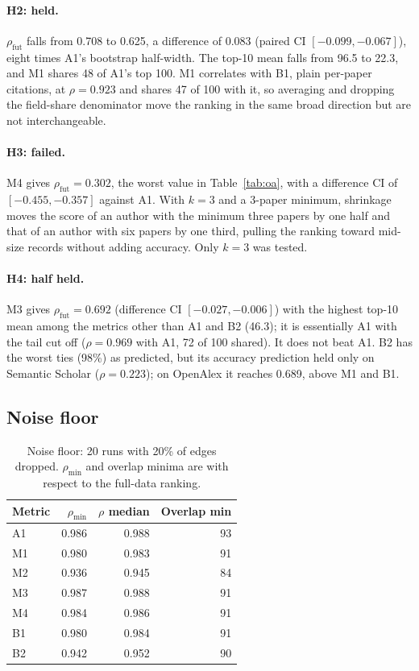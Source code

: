 \documentclass{article}
\begin{document}
\paragraph{H2: held.} $\rho_{\text{fut}}$ falls from 0.708 to 0.625, a difference of $0.083$
(paired CI $[-0.099, -0.067]$), eight times A1's bootstrap half-width. The top-10 mean falls from
96.5 to 22.3, and M1 shares 48 of A1's top 100. M1 correlates with B1, plain per-paper citations, at
$\rho = 0.923$ and shares 47 of 100 with it, so averaging and dropping the field-share
denominator move the ranking in the same broad direction but are not interchangeable.

\paragraph{H3: failed.} M4 gives $\rho_{\text{fut}} = 0.302$, the worst value in
Table~\ref{tab:oa}, with a difference CI of $[-0.455, -0.357]$ against A1. With $k=3$ and a
3-paper minimum, shrinkage moves the score of an author with the minimum three papers by one half
and that of an author with six papers by one third, pulling the ranking toward mid-size records
without adding accuracy. Only $k=3$ was tested.

\paragraph{H4: half held.} M3 gives $\rho_{\text{fut}} = 0.692$ (difference CI
$[-0.027, -0.006]$) with the highest top-10 mean among the metrics other than A1 and B2 (46.3); it is
essentially A1 with the tail cut off ($\rho = 0.969$ with A1, 72 of 100 shared). It does not beat
A1. B2 has the worst ties (98\%) as predicted, but its accuracy prediction held only on Semantic
Scholar ($\rho = 0.223$); on OpenAlex it reaches 0.689, above M1 and B1.

\subsection{Noise floor}

\begin{table}[h]
\caption{Noise floor: 20 runs with 20\% of edges dropped. $\rho_{\min}$ and overlap minima are
  with respect to the full-data ranking.}
\label{tab:noise}
\centering
\footnotesize
\setlength{\tabcolsep}{4pt}
\begin{tabular}{lrrr}
\toprule
\textbf{Metric} & $\rho_{\min}$ & $\rho$ median & Overlap min \\
\midrule
A1 & 0.986 & 0.988 & 93 \\
M1 & 0.980 & 0.983 & 91 \\
M2 & 0.936 & 0.945 & 84 \\
M3 & 0.987 & 0.988 & 91 \\
M4 & 0.984 & 0.986 & 91 \\
B1 & 0.980 & 0.984 & 91 \\
B2 & 0.942 & 0.952 & 90 \\
\bottomrule
\end{tabular}
\end{table}
\end{document}

